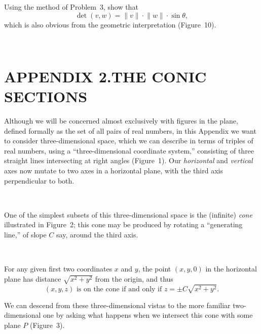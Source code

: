  Using the method of Problem~3, show that
\[
\det(v,w)=\lVert v\rVert\cdot\lVert w\rVert\cdot\sin\theta,
\]
which is also obvious from the geometric interpretation (Figure~10).

\begin{center}
\\[0.6em]
\end{center}

\section*{APPENDIX 2.\quad THE CONIC SECTIONS}

Although we will be concerned almost exclusively with figures in the plane,
defined formally as the set of all pairs of real numbers, in this Appendix we
want to consider three-dimensional space, which we can describe in terms of
triples of real numbers, using a ``three-dimensional coordinate system,''
consisting of three straight lines intersecting at right angles (Figure~1).
Our \emph{horizontal} and \emph{vertical} axes now mutate to two axes in a
horizontal plane, with the third axis perpendicular to both.

\begin{center}
\\[0.6em]
\end{center}

One of the simplest subsets of this three-dimensional space is the (infinite)
\emph{cone} illustrated in Figure~2; this cone may be produced by rotating a
``generating line,'' of slope $C$ say, around the third axis.

\begin{center}
\\[0.6em]
\end{center}

For any given first two coordinates $x$ and $y$, the point $(x,y,0)$ in the
horizontal plane has distance $\sqrt{x^2+y^2}$ from the origin, and thus
\begin{equation}
(x,y,z)\text{ is on the cone if and only if }z=\pm C\sqrt{x^2+y^2}.\tag{1}
\end{equation}

We can descend from these three-dimensional vistas to the more familiar
two-dimensional one by asking what happens when we intersect this cone with
some plane $P$ (Figure~3).

